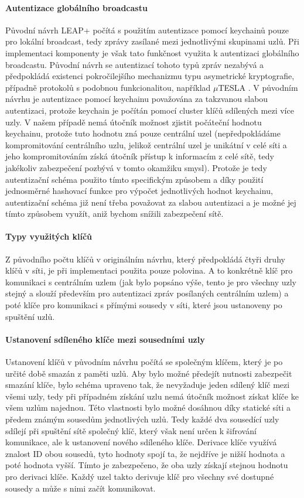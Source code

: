 \documentclass[11pt,final,twoside]{fithesis2}
\begin{document}
\paragraph{Autentizace globálního broadcastu}
Původní návrh LEAP+ počítá s použitím autentizace pomocí keychainů pouze pro lokální broadcast, tedy zprávy zasílané mezi jednotlivými skupinami uzlů. Při implementaci komponenty je však tato funkčnost 
využita k autentizaci globálního broadcastu. Původní návrh se autentizací tohoto typů zpráv nezabývá a předpokládá existenci pokročilejšího mechanizmu typu asymetrické kryptografie, případně protokolů
s podobnou funkcionalitou, například $\mu$TESLA \cite{Perrig2001}. V původním návrhu je autentizace pomocí keychainu považována za takzvanou slabou autentizaci, protože keychain je počítán pomocí 
cluster klíčů sdílených mezi více uzly. V našem případě nemá útočník možnost zjistit počáteční hodnotu keychainu, protože tuto hodnotu zná pouze centrální uzel (nepředpokládáme kompromitování centrálního
uzlu, jelikož centrální uzel je unikátní v celé síti a jeho kompromitováním získá útočník přístup k informacím z celé sítě, tedy jakékoliv zabezpečení pozbývá v tomto okamžiku smysl). Protože je tedy 
autentizační schéma použito tímto specifickým způsobem a díky použití jednosměrné hashovací funkce pro výpočet jednotlivých hodnot keychainu, autentizační schéma již není třeba považovat za slabou 
autentizaci a je možné jej tímto způsobem využít, aniž bychom snížili zabezpečení sítě.

\paragraph{Typy využitých klíčů}
Z původního počtu klíčů v originálním návrhu, který předpokládá čtyři druhy klíčů v síti, je při implementaci použita pouze polovina. A to konkrétně klíč pro komunikaci s centrálním uzlem (jak bylo popsáno 
výše, tento je pro všechny uzly stejný a slouží především pro autentizaci zpráv posílaných centrálním uzlem) a poté klíče pro komunikaci s přímými sousedy v síti, které jsou ustanoveny po spuštění uzlů. 

\paragraph{Ustanovení sdíleného klíče mezi sousedními uzly} \label{par:derive}
Ustanovení klíčů v původním návrhu počítá se společným klíčem, který je po určité době smazán z paměti uzlů. Aby bylo možné předejít nutnosti zabezpečit smazání klíče, bylo schéma upraveno tak, 
že nevyžaduje jeden sdílený klíč mezi všemi uzly, tedy při případném získání uzlu nemá útočník možnost získat klíče ke všem uzlům najednou. Této vlastnosti bylo možné dosáhnou díky statické síti a
předem známým sousedům jednotlivých uzlů. Tedy každé dva sousedící uzly sdílejí při spuštění sítě společný klíč, který však není určen k šifrování komunikace, ale k ustanovení nového sdíleného klíče.
Derivace klíče využívá znalost ID obou sousedů, tyto hodnoty spojí ta, že nejdříve je nižší hodnota a poté hodnota vyšší. Tímto je zabezpečeno, že oba uzly získají stejnou hodnotu pro derivaci klíče. 
Každý uzel takto derivuje klíč pro všechny své dostupné sousedy a může s nimi začít komunikovat.
\end{document}
